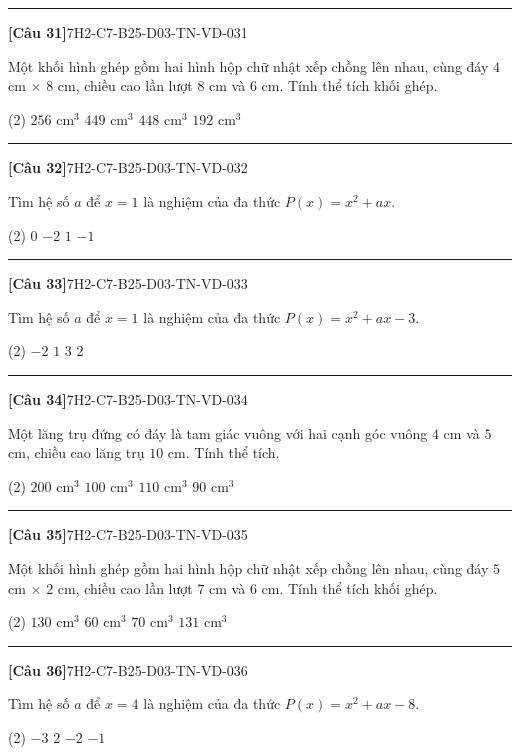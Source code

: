 \documentclass[12pt,a4paper]{article}
\newif\ifloigiai
\newenvironment{cauhoi}[2]{%
  \par\medskip\noindent\rule{\textwidth}{0.4pt}\par\nopagebreak
  \noindent\textbf{[#1]}\hfill{\scriptsize\ttfamily #2}\par\nopagebreak\smallskip}{\par}
\newcommand{\dapan}[1]{\ifloigiai\par\smallskip\noindent\textit{Đáp án:} \textbf{#1}\par\fi}
\begin{document}
\begin{cauhoi}{Câu 31}{7H2-C7-B25-D03-TN-VD-031}
Một khối hình ghép gồm hai hình hộp chữ nhật xếp chồng lên nhau, cùng đáy $4$ cm $\times$ $8$ cm, chiều cao lần lượt $8$ cm và $6$ cm. Tính thể tích khối ghép.
\begin{tasks}(2)
\task $256\text{ cm}^3$
\task $449\text{ cm}^3$
\task $448\text{ cm}^3$
\task $192\text{ cm}^3$
\end{tasks}
\dapan{C}
\end{cauhoi}
\begin{cauhoi}{Câu 32}{7H2-C7-B25-D03-TN-VD-032}
Tìm hệ số $a$ để $x=1$ là nghiệm của đa thức $P(x)=x^{2}+ax$.
\begin{tasks}(2)
\task $0$
\task $-2$
\task $1$
\task $-1$
\end{tasks}
\dapan{D}
\end{cauhoi}
\begin{cauhoi}{Câu 33}{7H2-C7-B25-D03-TN-VD-033}
Tìm hệ số $a$ để $x=1$ là nghiệm của đa thức $P(x)=x^{2}+ax-3$.
\begin{tasks}(2)
\task $-2$
\task $1$
\task $3$
\task $2$
\end{tasks}
\dapan{D}
\end{cauhoi}
\begin{cauhoi}{Câu 34}{7H2-C7-B25-D03-TN-VD-034}
Một lăng trụ đứng có đáy là tam giác vuông với hai cạnh góc vuông $4$ cm và $5$ cm, chiều cao lăng trụ $10$ cm. Tính thể tích.
\begin{tasks}(2)
\task $200\text{ cm}^3$
\task $100\text{ cm}^3$
\task $110\text{ cm}^3$
\task $90\text{ cm}^3$
\end{tasks}
\dapan{B}
\end{cauhoi}
\begin{cauhoi}{Câu 35}{7H2-C7-B25-D03-TN-VD-035}
Một khối hình ghép gồm hai hình hộp chữ nhật xếp chồng lên nhau, cùng đáy $5$ cm $\times$ $2$ cm, chiều cao lần lượt $7$ cm và $6$ cm. Tính thể tích khối ghép.
\begin{tasks}(2)
\task $130\text{ cm}^3$
\task $60\text{ cm}^3$
\task $70\text{ cm}^3$
\task $131\text{ cm}^3$
\end{tasks}
\dapan{A}
\end{cauhoi}
\begin{cauhoi}{Câu 36}{7H2-C7-B25-D03-TN-VD-036}
Tìm hệ số $a$ để $x=4$ là nghiệm của đa thức $P(x)=x^{2}+ax-8$.
\begin{tasks}(2)
\task $-3$
\task $2$
\task $-2$
\task $-1$
\end{tasks}
\dapan{C}
\end{cauhoi}
\end{document}
